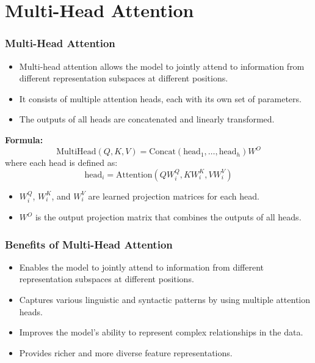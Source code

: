 \section{Multi-Head Attention}
\begin{frame}
  \frametitle{Multi-Head Attention}
  \begin{itemize}
    \item Multi-head attention allows the model to jointly attend to information from different representation subspaces at different positions.
    \item It consists of multiple attention heads, each with its own set of parameters.
    \item The outputs of all heads are concatenated and linearly transformed.
  \end{itemize}
  \textbf{Formula:}
  \[
  \text{MultiHead}(Q, K, V) = \text{Concat}\left(\text{head}_1, \ldots, \text{head}_h\right) W^O
  \]
  where each head is defined as:
  \[
  \text{head}_i = \text{Attention}(Q W_i^Q, K W_i^K, V W_i^V)
  \]
  \begin{itemize}
    \item $W_i^Q$, $W_i^K$, and $W_i^V$ are learned projection matrices for each head.
    \item $W^O$ is the output projection matrix that combines the outputs of all heads.
  \end{itemize}
\end{frame}

\begin{frame}
    \frametitle{Benefits of Multi-Head Attention}
    \begin{itemize}
        \item Enables the model to jointly attend to information from different representation subspaces at different positions.
        \item Captures various linguistic and syntactic patterns by using multiple attention heads.
        \item Improves the model's ability to represent complex relationships in the data.
        \item Provides richer and more diverse feature representations.
    \end{itemize}
\end{frame}
